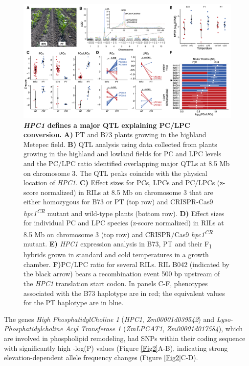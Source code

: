 \documentclass[9pt,twocolumn,twoside,lineno]{biorxiv}
\begin{document}
\begin{figure}[!ht]
\begin{center}
\includegraphics[width=0.8\paperwidth]{Figures/Fig_3.png}
\caption{\textbf{\textit{HPC1} defines a major QTL explaining PC/LPC conversion.} 
\textbf{A)} PT and B73 plants growing in the highland Metepec field. 
\textbf{B)} QTL analysis using data collected from plants growing in the highland and lowland fields for PC and LPC levels and the PC/LPC ratio identified overlapping major QTLs at 8.5 Mb on chromosome 3. 
The QTL peaks coincide with the physical location of \textit{HPC1}. 
\textbf{C)} Effect sizes for PCs, LPCs and PC/LPCs (z-score normalized) in RILs at 8.5 Mb on chromosome 3 that are either homozygous for B73 or PT (top row) and CRISPR-Cas9 \textit{hpc1\textsuperscript{CR}} mutant and wild-type plants (bottom row).        
\textbf{D)} Effect sizes for individual PC and LPC species (z-score normalized) in RILs at 8.5 Mb on chromosome 3 (top row) and CRISPR/Cas9 \textit{hpc1\textsuperscript{CR}} mutant.
\textbf{E)} \textit{HPC1} expression analysis in B73, PT and their F\textsubscript{1} hybrids grown in standard and cold temperatures in a growth chamber.
\textbf{F)}PC/LPC ratio for several RILs. RIL B042 (indicated by the black arrow) bears a recombination event 500 bp upstream of the \textit{HPC1} translation start codon.
In panels C-F, phenotypes associated with the B73 haplotype are in red; the equivalent values for the PT haplotype are in blue.}
\label{Fig3}
\end{center}
\end{figure} 
The genes  \textit{High PhosphatidylCholine 1} (\textit{HPC1}, \textit{Zm00001d039542}) and \textit{Lyso-Phosphatidylcholine Acyl Transferase 1} (\textit{ZmLPCAT1}, \textit{Zm00001d017584}), which are involved in phospholipid remodeling, had SNPs within their coding sequence with significantly high -log(P) values (Figure \ref{Fig2}A-B), indicating strong elevation-dependent allele frequency changes (Figure \ref{Fig2}C-D). 
\end{document}
